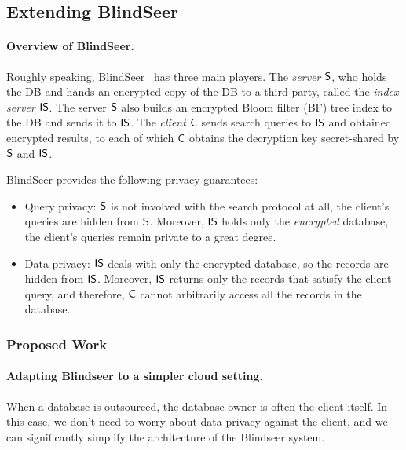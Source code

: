 \subsection{Extending BlindSeer}

\paragraph{Overview of BlindSeer.}
Roughly speaking, BlindSeer~\cite{SP:PKVKMC14,SP:FVKKKM15} has three main
players. The {\em server} $\sf S$, who holds the DB and hands an encrypted copy
of the DB to a third party, called the {\em index server} $\sf IS$. The server
$\sf S$  also builds an encrypted Bloom filter (BF) tree index to the DB and
sends it to $\sf IS$. The {\em client} $\sf C$ sends search queries to $\sf IS$
and obtained encrypted results, to each of which $\sf C$ obtains the decryption
key secret-shared by $\sf S$ and $\sf IS$. 

BlindSeer provides the following privacy guarantees:
\begin{itemize}
\item Query privacy: $\sf S$ is not involved with the search protocol at all,
the client's queries are hidden from $\sf S$. Moreover, $\sf IS$ holds only the
{\em encrypted} database, the client's queries remain private to a great
degree. 

\item Data privacy: $\sf IS$ deals with only the encrypted database, so the
records are hidden from $\sf IS$. Moreover, $\sf IS$ returns only the records
that satisfy the client query, and therefore, $\sf C$ cannot arbitrarily access
all the records in the database.  
\end{itemize}

\subsubsection{Proposed Work}

\paragraph{Adapting Blindseer to a simpler cloud setting.}
When a database is outsourced, the database owner is often the client itself.
In this case, we don't need to worry about data privacy against the client, and
we can significantly simplify the architecture of the Blindseer system. 


